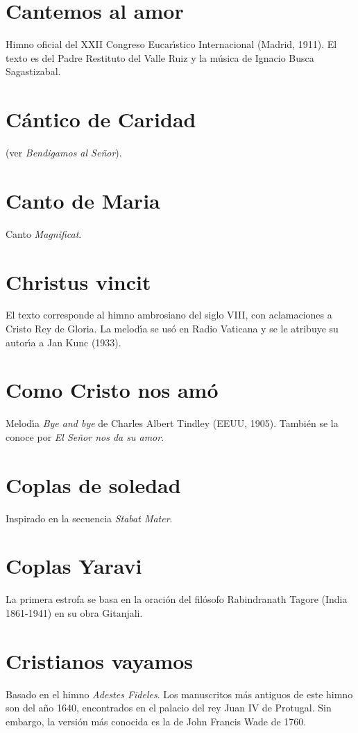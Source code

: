 \documentclass[landscape,12pt]{report}
\begin{document}
\section*{\small Cantemos al amor} \noindent\footnotesize Himno oficial del XXII Congreso Eucar\'\i stico Internacional (Madrid, 1911). El texto es del Padre Restituto del Valle Ruiz y la m\'usica de Ignacio Busca Sagastizabal. 
\section*{\small Cántico de Caridad} \noindent (ver \textit{Bendigamos al Señor}).
\section*{\small Canto de Maria} \noindent\footnotesize Canto \textit{Magnificat}.
\section*{\small Christus vincit} \noindent\footnotesize El texto corresponde al himno ambrosiano del siglo VIII, con aclamaciones a Cristo Rey de Gloria. La melod\'\i a  se us\'o en Radio Vaticana y se le atribuye su autor\'\i a a Jan Kunc (1933). 
\section*{\small Como Cristo nos am\'o} \noindent\footnotesize Melod\'\i a \emph{Bye and bye} de Charles Albert Tindley (EEUU, 1905). Tambi\'en se la conoce por \textit{El Se\~nor nos da su amor}. 
\section*{\small Coplas de soledad} \noindent\footnotesize Inspirado en la secuencia \textit{Stabat Mater}.
\section*{\small Coplas Yaravi} La primera estrofa se basa en la oraci\'on del fil\'osofo Rabindranath Tagore (India 1861-1941) en su obra Gitanjali.
\section*{\small Cristianos vayamos} \noindent\footnotesize Basado en el himno \textit{Adestes Fideles}. Los manuscritos m\'as antiguos de este himno son del a\~no 1640, encontrados en el palacio del rey Juan IV de Protugal. Sin embargo, la versi\'on m\'as conocida es la de John Francis Wade de 1760. 
\end{document}
